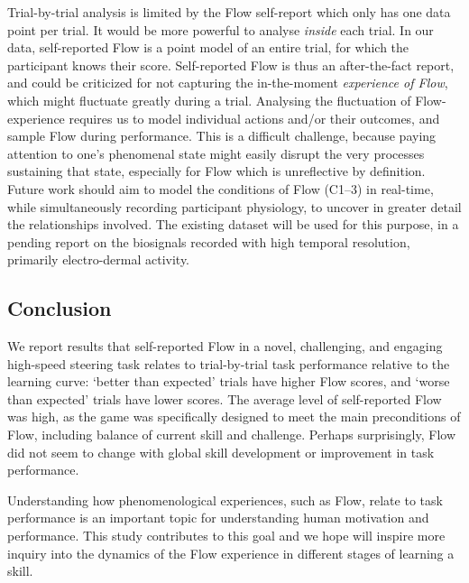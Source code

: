 \documentclass{frontierstyle/frontiersSCNS}
\begin{document}
Trial-by-trial analysis is limited by the Flow self-report which only has one data point per trial. It would be more powerful to analyse {\it inside} each trial. In our data, self-reported Flow is a point model of an entire trial, for which the participant knows their score. Self-reported Flow is thus an after-the-fact report, and could be criticized for not capturing the in-the-moment {\it experience of Flow}, which might fluctuate greatly during a trial. Analysing the fluctuation of Flow-experience requires us to model individual actions and/or their outcomes, and sample Flow during performance. This is a difficult challenge, because paying attention to one's phenomenal state might easily disrupt the very processes sustaining that state, especially for Flow which is unreflective by definition. Future work should aim to model the conditions of Flow ({\sf C1--3}) in real-time, while simultaneously recording participant physiology, to uncover in greater detail the relationships involved. The existing dataset will be used for this purpose, in a pending report on the biosignals recorded with high temporal resolution, primarily electro-dermal activity.


\subsection{Conclusion}

We report results that self-reported Flow in a novel, challenging, and engaging high-speed steering task relates to trial-by-trial task performance relative to the learning curve: `better than expected' trials have higher Flow scores, and `worse than expected' trials have lower scores. The average level of self-reported Flow was high, as the game was specifically designed to meet the main preconditions of Flow, including balance of current skill and challenge. Perhaps surprisingly, Flow did not seem to change with global skill development or improvement in task performance.

Understanding how phenomenological experiences, such as Flow, relate to task performance is an important topic for understanding human motivation and performance. This study contributes to this goal and we hope will inspire more inquiry into the dynamics of the Flow experience in different stages of learning a skill.
\end{document}
